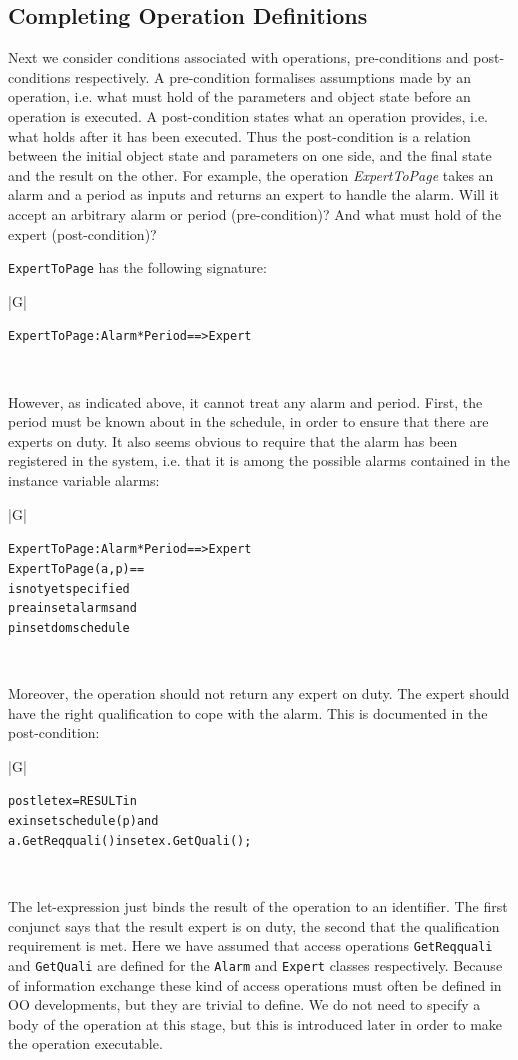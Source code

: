 \documentclass[\pformat,12pt,twoside]{article}
\newenvironment{VDMgray}%
{\begin{tabular}{|G|}\hline\small\begin{alltt}}%
{\end{alltt}\normalsize\\
 \hline\end{tabular}}
\begin{document}
\subsection{Completing Operation Definitions}

Next we consider conditions associated with operations, pre-conditions 
and post-conditions respectively. A pre-condition formalises 
assumptions made by an operation, i.e. what must hold of the 
parameters and object state before an operation is executed. 
A post-condition states what an operation provides, i.e. what 
holds after it has been executed. Thus the post-condition is 
a relation between the initial object state and parameters on 
one side, and the final state and the result on the other. For 
example, the operation \emph{ExpertToPage} takes an alarm and a period 
as inputs and returns an expert to handle the alarm. Will it 
accept an arbitrary alarm or period (pre-condition)? And what 
must hold of the expert (post-condition)?

\texttt{ExpertToPage} has the following signature:

\begin{VDMgray}
 ExpertToPage : Alarm * Period ==\texttt{>} Expert
\end{VDMgray}

However, as indicated above, it cannot treat any alarm and period. 
First, the period must be known about in the schedule, in order 
to ensure that there are experts on duty. It also seems obvious 
to require that the alarm has been registered in the system, 
i.e. that it is among the possible alarms contained in the instance 
variable alarms:

\begin{VDMgray}
 ExpertToPage : Alarm * Period ==\texttt{>} Expert
 ExpertToPage(a, p) ==
   is not yet specified
 pre a in set alarms and
     p in set dom schedule
\end{VDMgray}

Moreover, the operation should not return any expert on duty. 
The expert should have the right qualification to cope with the 
alarm. This is documented in the post-condition:

\begin{VDMgray}
 post let ex = RESULT in
        ex in set schedule(p) and
        a.GetReqquali() in set ex.GetQuali();
\end{VDMgray}

The let-expression just binds the result of the operation to an
identifier. The first conjunct says that the result expert is on duty,
the second that the qualification requirement is met. Here we have
assumed that access operations \texttt{GetReqquali} and
\texttt{GetQuali} are defined for the \texttt{Alarm} and
\texttt{Expert} classes respectively.  Because of information exchange
these kind of access operations must often be defined in OO
developments, but they are trivial to define. We do not need to
specify a body of the operation at this stage, but this is introduced
later in order to make the operation executable.
\end{document}

